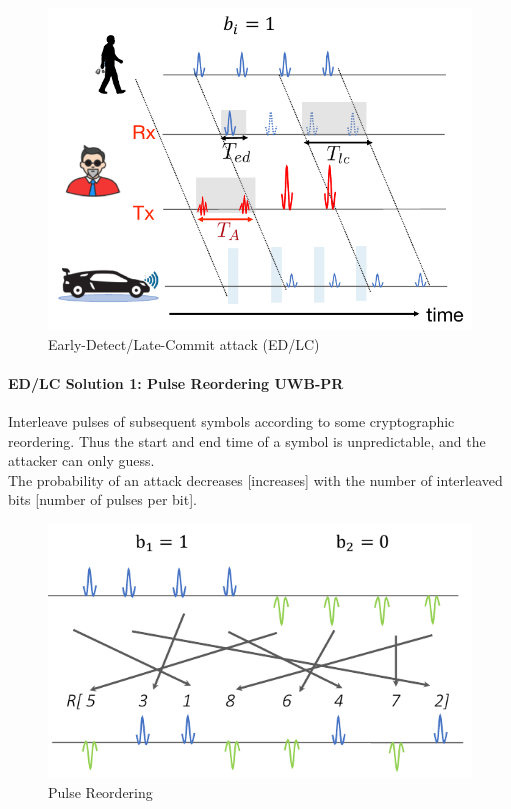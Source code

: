 \begin{figure}
	\centering
	\includegraphics[scale=0.4]{images/5-edlc.png}
	\caption{Early-Detect/Late-Commit attack (ED/LC)}
	\label{fig:edlc}
\end{figure}

\paragraph{ED/LC Solution 1: Pulse Reordering UWB-PR}
Interleave pulses of subsequent symbols according to some cryptographic reordering.
Thus the start and end time of a symbol is unpredictable, and the attacker can only guess.
\\
The probability of an attack decreases [increases] with the number of interleaved bits [number of pulses per bit].

\begin{figure}
	\centering
	\includegraphics[scale=0.45]{images/5-pulse-reordering.png}
	\caption{Pulse Reordering}
	\label{fig:pulse-reordering}
\end{figure}


